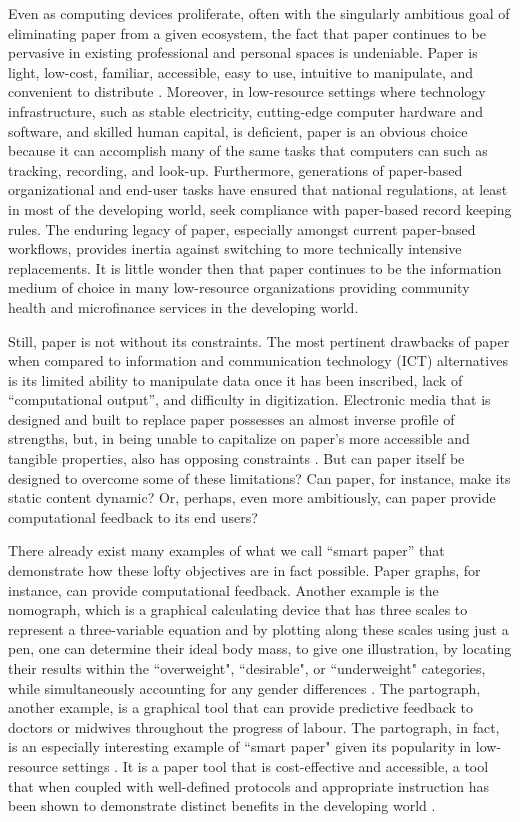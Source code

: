 \documentclass{sig-alternate}
\begin{document}
Even as computing devices proliferate, often with the singularly ambitious goal of eliminating paper from a given ecosystem, the fact that paper continues to be pervasive in existing professional and personal spaces is undeniable. Paper is light, low-cost, familiar, accessible, easy to use, intuitive to manipulate, and convenient to distribute \cite{sellen1997,sellen2002,johnson1993}. Moreover, in low-resource settings where technology infrastructure, such as stable electricity, cutting-edge computer hardware and software, and skilled human capital, is deficient, paper is an obvious choice because it can accomplish many of the same tasks that computers can such as tracking, recording, and look-up. Furthermore, generations of paper-based organizational and end-user tasks have ensured that national regulations, at least in most of the developing world, seek compliance with paper-based record keeping rules. The enduring legacy of paper, especially amongst current paper-based workflows, provides inertia against switching to more technically intensive replacements. It is little wonder then that paper continues to be the information medium of choice in many low-resource organizations providing community health and microfinance services in the developing world.

Still, paper is not without its constraints. The most pertinent drawbacks of paper when compared to information and communication technology (ICT) alternatives is its limited ability to manipulate data once it has been inscribed, lack of ``computational output'', and difficulty in digitization. Electronic media that is designed and built to replace paper possesses an almost inverse profile of strengths, but, in being unable to capitalize on paper's more accessible and tangible properties, also has opposing constraints \cite{johnson1993}. But can paper itself be designed to overcome some of these limitations? Can paper, for instance, make its static content dynamic? Or, perhaps, even more ambitiously, can paper provide computational feedback to its end users? 

There already exist many examples of what we call ``smart paper'' that demonstrate how these lofty objectives are in fact possible. Paper graphs, for instance, can provide computational feedback. Another example is the nomograph, which is a graphical calculating device that has three scales to represent a three-variable equation and by plotting along these scales using just a pen, one can determine their ideal body mass, to give one illustration, by locating their results within the ``overweight", ``desirable", or ``underweight" categories, while simultaneously accounting for any gender differences \cite{thomas1976}. The partograph, another example, is a graphical tool that can provide predictive feedback to doctors or midwives throughout the progress of labour\cite{who1988}. The partograph, in fact, is an especially interesting example of ``smart paper" given its popularity in low-resource settings \cite{fawole2009, umezulike1999}. It is a paper tool that is cost-effective and accessible, a tool that when coupled with well-defined protocols and appropriate instruction has been shown to demonstrate distinct benefits in the developing world \cite{fahdy2005, pettersson2000}. 
\end{document}
